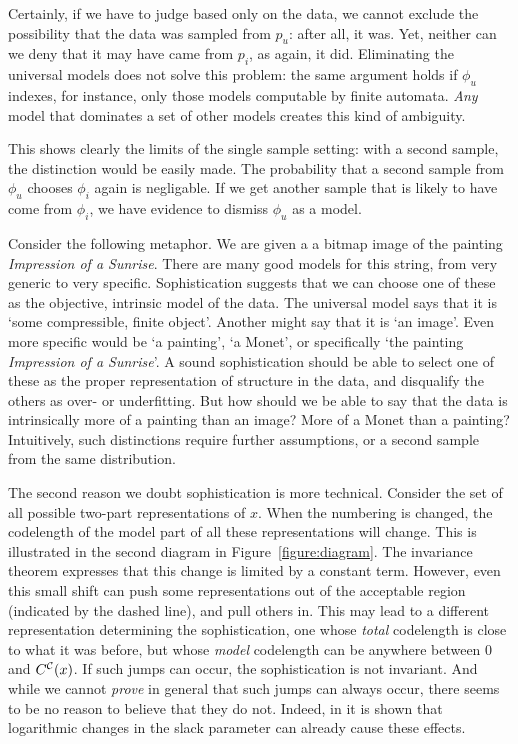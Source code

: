 Certainly, if we have to judge based only on the data, we cannot exclude the possibility that the data was sampled from $p_u$: after all, it was. Yet, neither can we deny that it may have came from $p_i$, as again, it did.  Eliminating the universal models does not solve this problem: the same argument holds if $\phi_u$ indexes, for instance, only those models computable by finite automata. \emph{Any} model that dominates a set of other models creates this kind of ambiguity.

This shows clearly the limits of the single sample setting: with a second sample, the distinction would be easily made. The probability that a second sample from $\phi_u$ chooses $\phi_i$ again is negligable. If we get another sample that is likely to have come from $\phi_i$, we have evidence to dismiss $\phi_u$ as a model. 

Consider the following metaphor. We are given a a bitmap image of the painting \emph{Impression of a Sunrise}. There are many good models for this string, from very generic to very specific. Sophistication suggests that we can choose one of these as the objective, intrinsic model of the data. The universal model says that it is `some compressible, finite object'. Another might say that it is `an image'. Even more specific would be `a painting', `a Monet', or specifically `the painting \emph{Impression of a Sunrise}'. A sound sophistication should be able to select one of these as the proper representation of structure in the data, and disqualify the others as over- or underfitting. But how should we be able to say that the data is intrinsically more of a painting than an image? More of a Monet than a painting? Intuitively, such distinctions require further assumptions, or a second sample from the same distribution.

The second reason we doubt sophistication is more technical. Consider the set of all possible two-part representations of $x$. When the numbering is changed, the codelength of the model part of all these representations will change. This is illustrated in the second diagram in Figure~\ref{figure:diagram}. The invariance theorem expresses that this change is limited by a constant term. However, even this small shift can push some representations out of the acceptable region (indicated by the dashed line), and pull others in. This may lead to a different representation determining the sophistication, one whose \emph{total} codelength is close to what it was before, but whose \emph{model} codelength can be anywhere between $0$ and $C^{\cal C}(x)$. If such jumps can occur, the sophistication is not invariant. And while we cannot \emph{prove} in general that such jumps can always occur, there seems to be no reason to believe that they do not. Indeed, in \cite{antunes2013sophistication} it is shown that logarithmic changes in the slack parameter can already cause these effects.

